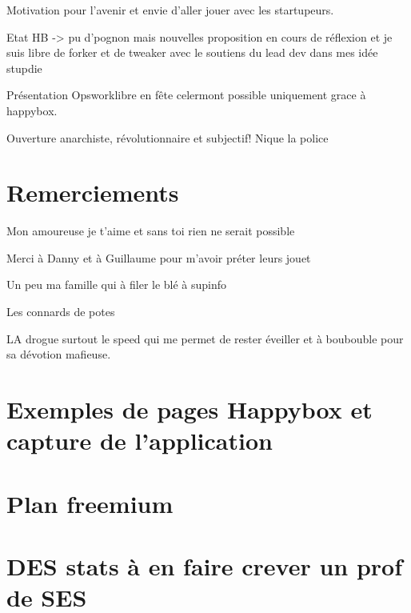 \documentclass[11pt, a4paper ]{article}
\let\stdsection\section
\renewcommand\section{\newpage\stdsection}
\begin{document}
\begin{spacing}{1.5}
		Motivation pour l'avenir et envie d'aller jouer avec les startupeurs.

		Etat HB -> pu d'pognon mais nouvelles proposition en cours de réflexion et je suis libre de forker et de tweaker avec le soutiens du lead dev dans mes idée stupdie

		Présentation Opsworklibre en fête celermont possible uniquement grace à happybox.

		Ouverture anarchiste, révolutionnaire et subjectif! Nique la police


	\section{Remerciements}

		Mon amoureuse je t'aime et sans toi rien ne serait possible

		Merci à Danny et à Guillaume pour m'avoir préter leurs jouet

		Un peu ma famille qui à filer le blé à supinfo

		Les connards de potes

		LA drogue surtout le speed qui me permet de rester éveiller et à boubouble pour sa dévotion mafieuse.


	\appendix
	\section{Exemples de pages Happybox et capture de l'application}
	\section{Plan freemium}

	\section{DES stats à en faire crever un prof de SES}

	\printindex

	
	
\end{spacing}
\end{document}
